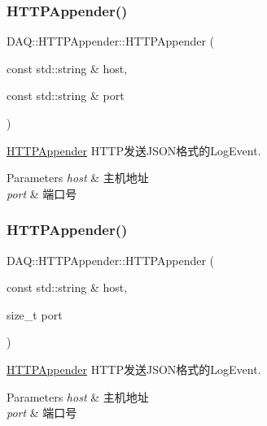 \subsubsection{\texorpdfstring{H\+T\+T\+P\+Appender()}{HTTPAppender()}\hspace{0.1cm}{\footnotesize\ttfamily [1/2]}}
{\footnotesize\ttfamily D\+A\+Q\+::\+H\+T\+T\+P\+Appender\+::\+H\+T\+T\+P\+Appender (\begin{DoxyParamCaption}\item[{const std\+::string \&}]{host,  }\item[{const std\+::string \&}]{port }\end{DoxyParamCaption})}



\hyperlink{classDAQ_1_1HTTPAppender}{H\+T\+T\+P\+Appender} H\+T\+T\+P发送\+J\+S\+O\+N格式的\+Log\+Event. 


\begin{DoxyParams}{Parameters}
{\em host} & 主机地址 \\
\hline
{\em port} & 端口号 \\
\hline
\end{DoxyParams}
\mbox{\label{classDAQ_1_1HTTPAppender_a43d9c11697616abca51421e118e9c16f}} 
\subsubsection{\texorpdfstring{H\+T\+T\+P\+Appender()}{HTTPAppender()}\hspace{0.1cm}{\footnotesize\ttfamily [2/2]}}
{\footnotesize\ttfamily D\+A\+Q\+::\+H\+T\+T\+P\+Appender\+::\+H\+T\+T\+P\+Appender (\begin{DoxyParamCaption}\item[{const std\+::string \&}]{host,  }\item[{size\+\_\+t}]{port }\end{DoxyParamCaption})}



\hyperlink{classDAQ_1_1HTTPAppender}{H\+T\+T\+P\+Appender} H\+T\+T\+P发送\+J\+S\+O\+N格式的\+Log\+Event. 


\begin{DoxyParams}{Parameters}
{\em host} & 主机地址 \\
\hline
{\em port} & 端口号 \\
\hline
\end{DoxyParams}


